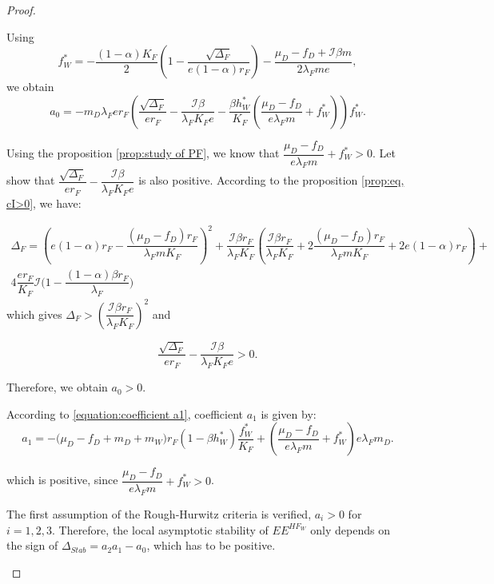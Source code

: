 \documentclass{article}
\newcommand{\lfw}{\lambda_{F}}
\newcommand{\lfw}{\lambda_{F}}
\newcommand{\cI}{\mathcal{I}}
\theoremstyle{definition}
\theoremstyle{remark}
\begin{document}
\begin{proof}
\begin{itemize}
Using
\begin{equation*}
f_W^* = -\dfrac{(1-\alpha)K_F}{2}\left(1 - \dfrac{\sqrt{\Delta_F}}{e(1-\alpha)r_F}\right) - \dfrac{\mu_D - f_D + \cI \beta m}{2\lfw m e},
\end{equation*}
we obtain
\begin{equation*}
a_0 = - m_D \lfw e r_F \left(\dfrac{\sqrt{\Delta_F}}{er_F} - \dfrac{\cI \beta}{\lfw K_F e} -  \dfrac{\beta h_W^*}{K_F} \left(\dfrac{\mu_D -f_D }{e \lfw m} + f_W^*\right)\right)  f^*_{W}.
\end{equation*}

Using the proposition \ref{prop:study of PF}, we know that $\dfrac{\mu_D -f_D }{e \lfw m} + f_W^* > 0$. Let show that  $\dfrac{\sqrt{\Delta_F}}{er_F} - \dfrac{\cI \beta}{\lfw K_F e}$ is also positive. According to the proposition \ref{prop:eq, cI>0}, we have:

\begin{multline*}
\Delta_F = \left(e(1-\alpha)r_F - \dfrac{(\mu_D - f_D) r_F}{\lfw m K_F}\right)^2 + \dfrac{\cI \beta r_F}{\lfw K_F} \left(\dfrac{\cI \beta r_F}{\lfw K_F} + 2\dfrac{(\mu_D - f_D) r_F}{\lfw m K_F} + 2e(1-\alpha)r_F \right) + \\ 4\dfrac{er_F}{K_F}  \cI\Big(1 - \dfrac{(1-\alpha)\beta r_F}{\lfw} \Big)
\end{multline*}
 which gives $\Delta_F > \left(\dfrac{\cI \beta r_F}{\lfw K_F}\right)^2$ and

\begin{equation*}
\dfrac{\sqrt{\Delta_F}}{er_F} - \dfrac{\cI \beta}{\lfw K_F e} > 0.
\end{equation*}

Therefore, we obtain $a_0 > 0$.

According to \eqref{equation:coefficient a1}, coefficient $a_1$ is given by:
\begin{equation*}
a_1 = -\big( \mu_D  -f_D + m_D + m_W) r_F(1 - \beta h_W^*) \dfrac{f^*_W}{K_F} + \left(\dfrac{\mu_D -f_D}{e\lfw m} + f_W^*\right) e \lfw m_D .
\end{equation*}

which is positive, since  $\dfrac{\mu_D - f_D}{e \lfw m} +  f^*_{W} > 0$.

The first assumption of the Rough-Hurwitz criteria is verified, $a_i > 0$ for $i=1,2,3$. Therefore, the local asymptotic stability of $EE^{HF_W}$ only depends on the sign of $\Delta_{Stab}= a_2 a_1 - a_0$, which has to be positive.
\end{itemize}
\end{proof}
\end{document}
